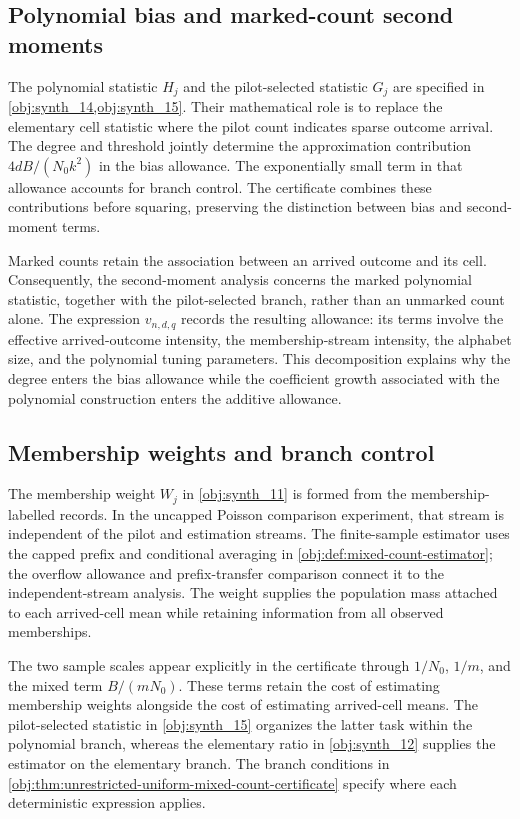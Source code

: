 \subsection{Polynomial bias and marked-count second moments}

The polynomial statistic \(H_j\) and the pilot-selected statistic \(G_j\) are specified in \cref{obj:synth_14,obj:synth_15}. Their mathematical role is to replace the elementary cell statistic where the pilot count indicates sparse outcome arrival. The degree and threshold jointly determine the approximation contribution \(4dB/(N_0k^2)\) in the bias allowance. The exponentially small term in that allowance accounts for branch control. The certificate combines these contributions before squaring, preserving the distinction between bias and second-moment terms.

Marked counts retain the association between an arrived outcome and its cell. Consequently, the second-moment analysis concerns the marked polynomial statistic, together with the pilot-selected branch, rather than an unmarked count alone. The expression \(v_{n,d,q}\) records the resulting allowance: its terms involve the effective arrived-outcome intensity, the membership-stream intensity, the alphabet size, and the polynomial tuning parameters. This decomposition explains why the degree enters the bias allowance while the coefficient growth associated with the polynomial construction enters the additive allowance.

\subsection{Membership weights and branch control}

The membership weight \(W_j\) in \cref{obj:synth_11} is formed from the membership-labelled records. In the uncapped Poisson comparison experiment, that stream is independent of the pilot and estimation streams. The finite-sample estimator uses the capped prefix and conditional averaging in \cref{obj:def:mixed-count-estimator}; the overflow allowance and prefix-transfer comparison connect it to the independent-stream analysis. The weight supplies the population mass attached to each arrived-cell mean while retaining information from all observed memberships.

The two sample scales appear explicitly in the certificate through \(1/N_0\), \(1/m\), and the mixed term \(B/(mN_0)\). These terms retain the cost of estimating membership weights alongside the cost of estimating arrived-cell means. The pilot-selected statistic in \cref{obj:synth_15} organizes the latter task within the polynomial branch, whereas the elementary ratio in \cref{obj:synth_12} supplies the estimator on the elementary branch. The branch conditions in \cref{obj:thm:unrestricted-uniform-mixed-count-certificate} specify where each deterministic expression applies.

